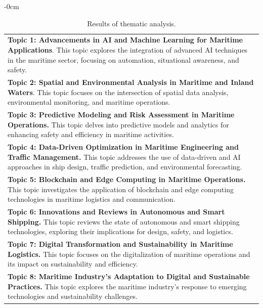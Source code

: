 \documentclass[jmse,review,submit,pdftex,moreauthors]{Definitions/mdpi}
\begin{document}
\begin{adjustwidth}{-\extralength}{0cm}
\begin{table}[H]
	\centering
	\caption{Results of thematic analysis.}
	\begin{tabularx}{\linewidth}{X}
		\hline
		\textbf{Topic 1: Advancements in AI and Machine Learning for Maritime Applications}. This topic explores the integration of advanced AI techniques in the maritime sector, focusing on automation, situational awareness, and safety.\\			
		\textbf{Topic 2: Spatial and Environmental Analysis in Maritime and Inland Waters}. This topic focuses on the intersection of spatial data analysis, environmental monitoring, and maritime operations.\\			
		\textbf{Topic 3: Predictive Modeling and Risk Assessment in Maritime Operations.} This topic delves into predictive models and analytics for enhancing safety and efficiency in maritime activities.\\			
		\textbf{Topic 4: Data-Driven Optimization in Maritime Engineering and Traffic Management.} This topic addresses the use of data-driven and AI approaches in ship design, traffic prediction, and environmental forecasting.\\			
		\textbf{Topic 5: Blockchain and Edge Computing in Maritime Operations.} This topic investigates the application of blockchain and edge computing technologies in maritime logistics and communication.\\			
		\textbf{Topic 6: Innovations and Reviews in Autonomous and Smart Shipping.} This topic reviews the state of autonomous and smart shipping technologies, exploring their implications for design, safety, and logistics.\\			
		\textbf{Topic 7: Digital Transformation and Sustainability in Maritime Logistics.} This topic focuses on the digitalization of maritime operations and its impact on sustainability and efficiency.\\			
		\textbf{Topic 8: Maritime Industry’s Adaptation to Digital and Sustainable Practices.} This topic explores the maritime industry's response to emerging technologies and sustainability challenges.\\
		\hline			
	\end{tabularx}
	\label{tab:thematic}
\end{table}


\end{adjustwidth}
\end{document}
